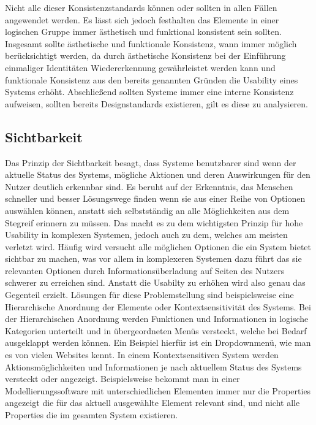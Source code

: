 Nicht alle dieser Konsistenzstandards können oder sollten in allen Fällen angewendet werden. 
Es lässt sich jedoch festhalten das Elemente in einer logischen Gruppe immer ästhetisch und funktional konsistent sein sollten.
Insgesamt sollte ästhetische und funktionale Konsistenz, wann immer möglich berücksichtigt werden, da durch ästhetische Konsistenz bei der Einführung einmaliger Identitäten Wiedererkennung gewährleistet werden kann und funktionale Konsistenz aus den bereits genannten Gründen die Usability eines Systems erhöht.
Abschließend sollten Systeme immer eine interne Konsistenz aufweisen, sollten bereits Designstandards existieren, gilt es diese zu analysieren.\cite{Lidwell.2010}

\subsection*{Sichtbarkeit}

Das Prinzip der Sichtbarkeit besagt, dass Systeme benutzbarer sind wenn der aktuelle Status des Systems, mögliche Aktionen und deren Auswirkungen für den Nutzer deutlich erkennbar sind.
Es beruht auf der Erkenntnis, das Menschen schneller und besser Lösungswege finden wenn sie aus einer Reihe von Optionen auswählen können, anstatt sich selbstständig an alle Möglichkeiten aus dem Stegreif erinnern zu müssen\cite{Lidwell.2010}.
Das macht es zu dem wichtigsten Prinzip für hohe Usability in komplexen Systemen, jedoch auch zu dem, welches am meisten verletzt wird\cite{Norman.2016}.
Häufig wird versucht alle möglichen Optionen die ein System bietet sichtbar zu machen, was vor allem in komplexeren Systemen dazu führt das sie relevanten Optionen durch Informationsüberladung auf Seiten des Nutzers schwerer zu erreichen sind. 
Anstatt die Usabilty zu erhöhen wird also genau das Gegenteil erzielt.
Lösungen für diese Problemstellung sind beispielsweise eine Hierarchische Anordnung der Elemente oder Kontextsensitivität des Systems.
Bei der Hierarchischen Anordnung werden Funktionen und Informationen in logische Kategorien unterteilt und in übergeordneten Menüs versteckt, welche bei Bedarf ausgeklappt werden können. Ein Beispiel hierfür ist ein Dropdownmenü, wie man es von vielen Websites kennt.
In einem Kontextsensitiven System werden Aktionsmöglichkeiten und Informationen je nach aktuellem Status des Systems versteckt oder angezeigt. Beispielsweise bekommt man in einer Modellierungssoftware mit unterschiedlichen Elementen immer nur die Properties angezeigt die für das aktuell ausgewählte Element relevant sind, und nicht alle Properties die im gesamten System existieren\cite{Lidwell.2010}.

